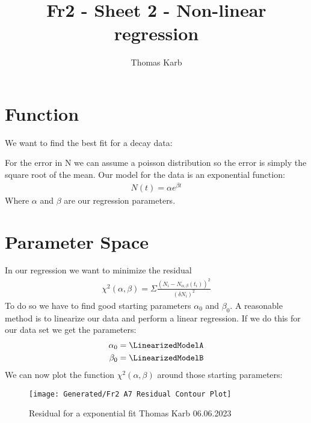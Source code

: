 \documentclass[11pt]{article}
\begin{document}
    \author{Thomas Karb}
    \title{Fr2 - Sheet 2 - Non-linear regression}
    
    \maketitle

    \section{Function}
    We want to find the best fit for a decay data:
    
    For the error in N we can assume a poisson distribution so the error is simply the square root of the mean.
    Our model for the data is an exponential function:
    \begin{align*}
        N(t) = \alpha e^{\beta t}
    \end{align*}
    Where $\alpha$ and $\beta$ are our regression parameters.
    
    \section{Parameter Space}
    In our regression we want to minimize the residual
    \begin{align*}
        \chi^2(\alpha,\beta) = \Sigma \frac{(N_i - N_{\alpha,\beta}(t_i))^2}{(\delta N_i)^2}
    \end{align*}
    To do so we have to find good starting parameters $\alpha_0$ and $\beta_0$.
    A reasonable method is to linearize our data and perform a linear regression.
    If we do this for our data set we get the parameters:
    \begin{align*}
        \alpha_0 &= \LinearizedModelA \\
        \beta_0 &= \LinearizedModelB 
    \end{align*}
    We can now plot the function $\chi^2(\alpha,\beta)$ around those starting parameters:
    \begin{figure}[h!]
        \texttt{[image: Generated/Fr2 A7 Residual Contour Plot]}
        \caption{Residual for a exponential fit  Thomas Karb 06.06.2023}
        \label{fig:RisidualForAExpFit}
    \end{figure}
\end{document}
